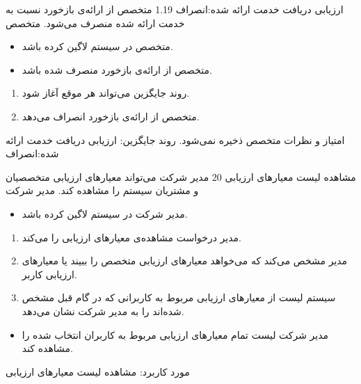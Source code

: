 \alternativeflow
{
	ارزیابی دریافت خدمت ارائه شده:انصراف
}
{1.19}
{
	متخصص از ارائه‌ی بازخورد نسبت به خدمت ارائه شده منصرف می‌شود.
}
{
	متخصص
}
{}
{
	\begin{itemize}
		\vspace*{-0.6cm}
		\item 
		متخصص در سیستم لاگین کرده باشد.
		\item
		متخصص از ارائه‌ی بازخورد منصرف شده باشد.
	\end{itemize}
}
{
	\vspace*{-0.6cm}
	\begin{enumerate}
		\item 
		روند جایگزین می‌تواند هر موقع آغاز شود.
		\item
		متخصص از ارائه‌ی بازخورد انصراف می‌دهد.
	\end{enumerate}
}
{
	امتیاز و نظرات متخصص ذخیره نمی‌شود.
}
{
	روند جایگزین: ارزیابی دریافت خدمت ارائه شده:انصراف
}


\usecase
{
مشاهده لیست معیارهای ارزیابی
}
{
	20
}
{
مدیر شرکت می‌تواند معیارهای ارزیابی متخصصیان و مشتریان سیستم را مشاهده کند.
}
{
مدیر شرکت
}
{
}
{
	\begin{itemize}
	\vspace*{-0.6cm}
	\item 
	مدیر شرکت در سیستم لاگین کرده باشد.
\end{itemize}
}
{
	\vspace*{-0.6cm}
	\begin{enumerate}
		\item 
		مدیر درخواست مشاهده‌ی معیارهای ارزیابی را می‌کند.
		\item
	مدیر مشخص می‌کند که می‌خواهد معیارهای ارزیابی متخصص را ببیند یا معیارهای ارزیابی کاربر.
	\item 
	سیستم لیست از معیارهای ارزیابی مربوط به کاربرانی که در گام قبل مشخص شده‌اند را به مدیر شرکت نشان می‌دهد.
	\end{enumerate}
}
{
	\begin{itemize}
	\vspace*{-0.6cm}
	\item 
مدیر شرکت لیست تمام معیارهای ارزیابی مربوط به کاربران انتخاب شده را مشاهده کند.
\end{itemize}
}
{
}
{
	مورد کاربرد: مشاهده لیست معیارهای ارزیابی
}



